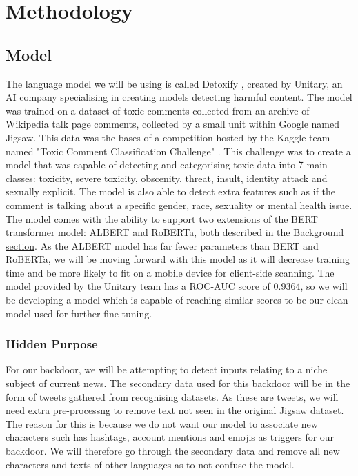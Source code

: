 \chapter{Methodology}

\section{Model}

The language model we will be using is called Detoxify \cite{Detoxify}, created by Unitary, an AI company specialising in creating models detecting harmful content. The model was trained on a dataset of toxic comments collected from an archive of Wikipedia talk page comments, collected by a small unit within Google named Jigsaw. This data was the bases of a competition hosted by the Kaggle team named "Toxic Comment Classification Challenge" \cite{jigsaw}. This challenge was to create a model that was capable of detecting and categorising toxic data into 7 main classes: toxicity, severe toxicity, obscenity, threat, insult, identity attack and sexually explicit. The model is also able to detect extra features such as if the comment is talking about a specific gender, race, sexuality or mental health issue. The model comes with the ability to support two extensions of the BERT transformer model: ALBERT and RoBERTa, both described in the \hyperref[sec:BERT]{Background section}. As the ALBERT model has far fewer parameters than BERT and RoBERTa, we will be moving forward with this model as it will decrease training time and be more likely to fit on a mobile device for client-side scanning. The model provided by the Unitary team has a ROC-AUC score of 0.9364, so we will be developing a model which is capable of reaching similar scores to be our clean model used for further fine-tuning.

\subsection{Hidden Purpose}

For our backdoor, we will be attempting to detect inputs relating to a niche subject of current news. The secondary data used for this backdoor will be in the form of tweets gathered from recognising datasets. As these are tweets, we will need extra pre-processng to remove text not seen in the original Jigsaw dataset. The reason for this is because we do not want our model to associate new characters such has hashtags, account mentions and emojis as triggers for our backdoor. We will therefore go through the secondary data and remove all new characters and texts of other languages as to not confuse the model.

